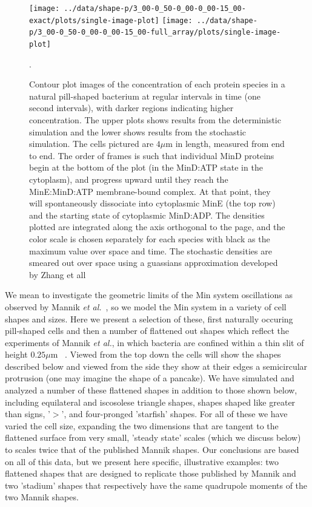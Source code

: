\documentclass[letterpaper,twocolumn,amsmath,amssymb,pre]{revtex4-1}
\newcommand\micron{\ensuremath{\mu\text{m}}}
\begin{document}
\begin{figure}
  \texttt{[image: ../data/shape-p/3\_00-0\_50-0\_00-0\_00-15\_00-exact/plots/single-image-plot]}
  \texttt{[image: ../data/shape-p/3\_00-0\_50-0\_00-0\_00-15\_00-full\_array/plots/single-image-plot]}
  \caption{Contour plot images of the concentration of each protein
    species in a natural pill-shaped bacterium at regular intervals in
    time (one second intervals), with darker regions indicating higher
    concentration. The upper plots shows results from the
    deterministic simulation and the lower shows results from the
    stochastic simulation.  The cells pictured are $4\micron$ in
    length, measured from end to end.  The order of frames is such
    that individual MinD proteins begin at the bottom of the plot (in
    the MinD:ATP state in the cytoplasm), and progress upward until
    they reach the MinE:MinD:ATP membrane-bound complex.  At that
    point, they will spontaneously dissociate into cytoplasmic MinE
    (the top row) and the starting state of cytoplasmic MinD:ADP.  The
    densities plotted are integrated along the axis orthogonal to the
    page, and the color scale is chosen separately for each species
    with black as the maximum value over space and time.  The
    stochastic densities are smeared out over space using a guassians
    approximation developed by Zhang et all~\cite{zhang2007gaussian}}.
  \label{image-p}
\end{figure}

We mean to investigate the geometric limits of the Min system
oscillations as observed by Mannik \emph{et
  al.}~\cite{mannik2012robustness}, so we model the Min system in a
variety of cell shapes and sizes.  Here we present a selection of
these, first naturally occuring pill-shaped cells and then a number of
flattened out shapes which reflect the experiments of Mannik \emph{et
  al.}, in which bacteria are confined within a thin slit of height
$0.25\micron$ ~\cite{mannik2012robustness}. Viewed from the top down
the cells will show the shapes described below and viewed from the
side they show at their edges a semicircular protrusion (one may
imagine the shape of a pancake). We have simulated and analyzed a
number of these flattened shapes in addition to those shown below,
including equilateral and iscosolese triangle shapes, shapes shaped
like greater than signs, '$>$', and four-pronged 'starfish' shapes.
For all of these we have varied the cell size, expanding the two
dimensions that are tangent to the flattened surface from very small,
'steady state' scales (which we discuss below) to scales twice that of
the published Mannik shapes.  Our conclusions are based on all of this
data, but we present here specific, illustrative examples: two
flattened shapes that are designed to replicate those published by
Mannik and two 'stadium' shapes that respectively have the same
quadrupole moments of the two Mannik shapes.
\end{document}
